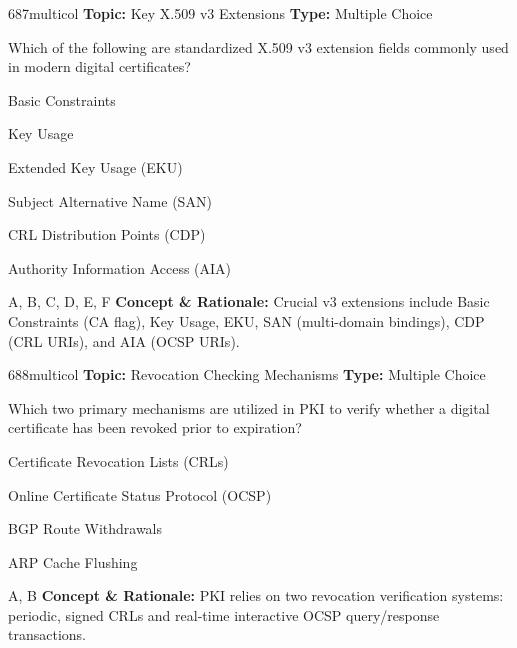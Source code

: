 \begin{qcard}{687}{multicol}
\textcolor{darkslate!75}{\small\textbf{Topic:} Key X.509 v3 Extensions \hfill \textbf{Type:} Multiple Choice}\vspace{0.4em}\par
Which of the following are standardized X.509 v3 extension fields commonly used in modern digital certificates?
\begin{qoptions}
\item Basic Constraints
\item Key Usage
\item Extended Key Usage (EKU)
\item Subject Alternative Name (SAN)
\item CRL Distribution Points (CDP)
\item Authority Information Access (AIA)
\end{qoptions}
\end{qcard}
\nopagebreak
\begin{explainbox}{A, B, C, D, E, F}
\textbf{Concept \& Rationale:} Crucial v3 extensions include Basic Constraints (CA flag), Key Usage, EKU, SAN (multi-domain bindings), CDP (CRL URIs), and AIA (OCSP URIs).
\end{explainbox}

\begin{qcard}{688}{multicol}
\textcolor{darkslate!75}{\small\textbf{Topic:} Revocation Checking Mechanisms \hfill \textbf{Type:} Multiple Choice}\vspace{0.4em}\par
Which two primary mechanisms are utilized in PKI to verify whether a digital certificate has been revoked prior to expiration?
\begin{qoptions}
\item Certificate Revocation Lists (CRLs)
\item Online Certificate Status Protocol (OCSP)
\item BGP Route Withdrawals
\item ARP Cache Flushing
\end{qoptions}
\end{qcard}
\nopagebreak
\begin{explainbox}{A, B}
\textbf{Concept \& Rationale:} PKI relies on two revocation verification systems: periodic, signed CRLs and real-time interactive OCSP query/response transactions.
\end{explainbox}

